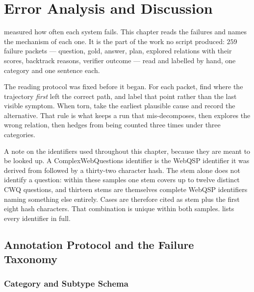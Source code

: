 \chapter{Error Analysis and Discussion}\label{ch:erroranalysis}

 measured how often each system fails. This chapter reads the
failures and names the mechanism of each one. It is the part of the work no
script produced: $259$ failure packets --- question, gold, answer, plan,
explored relations with their scores, backtrack reasons, verifier outcome ---
read and labelled by hand, one category and one sentence each.

The reading protocol was fixed before it began. For each packet, find where the
trajectory \emph{first} left the correct path, and label that point rather than
the last visible symptom. When torn, take the earliest plausible cause and
record the alternative. That rule is what keeps a run that mis-decomposes, then
explores the wrong relation, then hedges from being counted three times under
three categories.

A note on the identifiers used throughout this chapter, because they are meant
to be looked up. A ComplexWebQuestions identifier is the WebQSP identifier it
was derived from followed by a thirty-two character hash. The stem alone
does not identify a question: within these samples one stem covers up to twelve
distinct CWQ questions, and thirteen stems are themselves complete WebQSP
identifiers naming something else entirely. Cases are therefore cited as stem
plus the first eight hash characters. That combination is unique within both
samples.  lists every identifier in full.

\section{Annotation Protocol and the Failure Taxonomy}\label{sec:taxonomy}

\subsection{Category and Subtype Schema}

